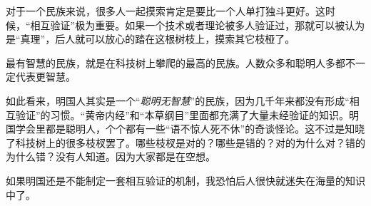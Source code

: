 对于一个民族来说，很多人一起摸索肯定是要比一个人单打独斗更好。这时候，“相互验证”极为重要。如果一个技术或者理论被多人验证过，那就可以被认为是“真理”，后人就可以放心的踏在这根树枝上，摸索其它枝桠了。

最有智慧的民族，就是在科技树上攀爬的最高的民族。人数众多和聪明人多都不一定代表更智慧。

如此看来，明国人其实是一个“\emph{聪明无智慧}”的民族，因为几千年来都没有形成“相互验证”的习惯。“黄帝内经”和“本草纲目”里面都充满了大量未经验证的知识。明国学会里都是聪明人，个个都有一些“语不惊人死不休”的奇谈怪论。这不过是知晓了科技树上的很多枝杈罢了。哪些枝杈是对的？哪些是错的？对的为什么对？错的为什么错？没有人知道。因为大家都是在空想。

如果明国还是不能制定一套相互验证的机制，我恐怕后人很快就迷失在海量的知识中了。